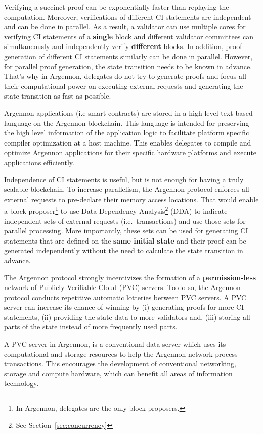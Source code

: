 Verifying a succinct proof can be exponentially faster than replaying the computation. Moreover, verifications of
different CI statements are independent and can be done in parallel. As a result, a validator can use multiple cores for
verifying CI statements of a \textbf{single} block and different validator committees can simultaneously and
independently verify \textbf{different} blocks.
In addition, proof generation of different CI statements similarly can be done in parallel. However, for parallel
proof generation, the state transition needs to be known in advance. That's why in Argennon, delegates do not try
to generate proofs and focus all their computational power on executing external requests and
generating the state transition as fast as possible.

Argennon applications (i.e smart contracts) are stored in a high level text based language on the Argennon
blockchain. This language is intended for preserving the
high level information of the application logic to facilitate platform specific compiler optimization at a host
machine. This enables delegates to compile and optimize Argennon applications for their specific hardware platforms
and execute applications efficiently.

Independence of CI statements is useful, but is not enough for having a truly scalable blockchain. To increase
parallelism, the Argennon protocol enforces all external requests to pre-declare their memory access locations. That
would enable a block proposer\footnote{In Argennon, delegates are the only block proposers.} to use Data Dependency
Analysis\footnote{See Section~\ref{sec:concurrency}} (DDA) to indicate independent sets of external requests (i.e.\
transactions) and use those sets for parallel processing. More importantly, these sets can be used for generating CI
statements that are defined on the \textbf{same initial state} and their proof can be generated independently without
the need to calculate the state transition in advance.

The Argennon protocol strongly incentivizes the formation of a \textbf{permission-less} network of Publicly Verifiable
Cloud (PVC) servers. To do so, the Argennon protocol conducts repetitive automatic lotteries between PVC servers.
A PVC server can increase its chance of winning by (i) generating proofs for more CI statements, (ii) providing the
state data to more validators and, (iii) storing all parts of the state instead of more frequently used parts.

A PVC server in Argennon, is a conventional data server which uses its computational and
storage resources to help the Argennon network process transactions. This encourages the development
of conventional networking, storage and compute hardware, which can benefit all areas of information technology.
